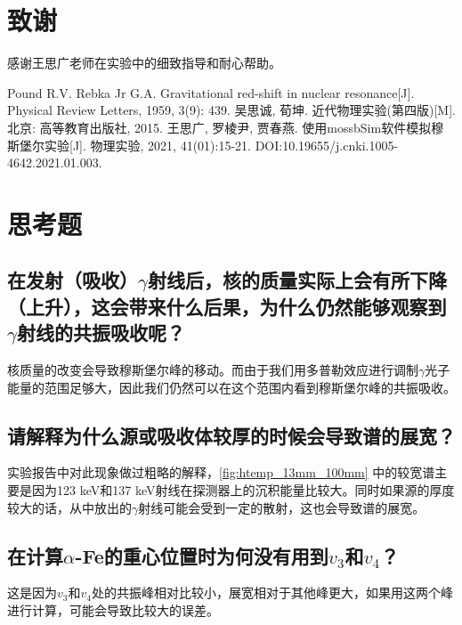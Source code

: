 \documentclass[font=default]{mpltx}
\begin{document}
\section{致谢}
感谢王思广老师在实验中的细致指导和耐心帮助。
\begin{thebibliography}{}
   Pound R.V. Rebka Jr G.A. Gravitational red-shift in nuclear resonance[J]. Physical Review Letters, 1959, 3(9): 439.
   吴思诚, 荀坤. 近代物理实验(第四版)[M]. 北京: 高等教育出版社, 2015.
   王思广, 罗棱尹, 贾春燕. 使用mossbSim软件模拟穆斯堡尔实验[J]. 物理实验, 2021, 41(01):15-21. DOI:10.19655/j.cnki.1005-4642.2021.01.003.
\end{thebibliography}

\appendix

\section{思考题}
\subsection{在发射（吸收）$\gamma$射线后，核的质量实际上会有所下降（上升），这会带来什么后果，为什么仍然能够观察到$\gamma$射线的共振吸收呢？}
核质量的改变会导致穆斯堡尔峰的移动。而由于我们用多普勒效应进行调制$\gamma$光子能量的范围足够大，因此我们仍然可以在这个范围内看到穆斯堡尔峰的共振吸收。

\subsection{请解释为什么源或吸收体较厚的时候会导致谱的展宽？}
实验报告中对此现象做过粗略的解释，\autoref{fig:htemp_13mm_100mm} 中的较宽谱主要是因为123 keV和137 keV射线在探测器上的沉积能量比较大。同时如果源的厚度较大的话，从中放出的$\gamma$射线可能会受到一定的散射，这也会导致谱的展宽。

\subsection{在计算$\alpha$-Fe的重心位置时为何没有用到$v_3$和$v_4$？}
这是因为$v_3$和$v_4$处的共振峰相对比较小，展宽相对于其他峰更大，如果用这两个峰进行计算，可能会导致比较大的误差。
\end{document}
